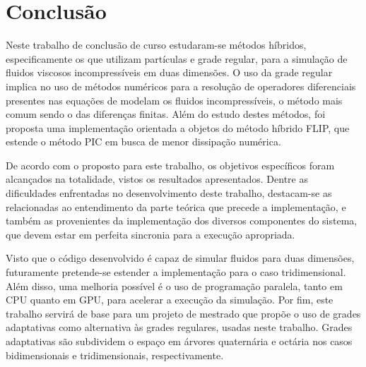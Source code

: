 \documentclass[12pt,a4paper,dvipsnames]{article}
\begin{document}
\clearpage


\section{Conclusão}
\label{sec:conclusion}

Neste trabalho de conclusão de curso estudaram-se métodos híbridos, especificamente os que utilizam partículas e grade regular, para a simulação de fluidos viscosos incompressíveis em duas dimensões. O uso da grade regular implica no uso de métodos numéricos para a resolução de operadores diferenciais presentes nas equações de modelam os fluidos incompressíveis, o método mais comum sendo o das diferenças finitas. Além do estudo destes métodos, foi proposta uma implementação orientada a objetos do método híbrido FLIP, que estende o método PIC em busca de menor dissipação numérica.

De acordo com o proposto para este trabalho, os objetivos específicos foram alcançados na totalidade, vistos os resultados apresentados. Dentre as dificuldades enfrentadas no desenvolvimento deste trabalho, destacam-se as relacionadas ao entendimento da parte teórica que precede a implementação, e também as provenientes da implementação dos diversos componentes do sistema, que devem estar em perfeita sincronia para a execução apropriada.

Visto que o código desenvolvido é capaz de simular fluidos para duas dimensões, futuramente pretende-se estender a implementação para o caso tridimensional. Além disso, uma melhoria possível é o uso de programação paralela, tanto em CPU quanto em GPU, para acelerar a execução da simulação. Por fim, este trabalho servirá de base para um projeto de mestrado que propõe o uso de grades adaptativas como alternativa às grades regulares, usadas neste trabalho. Grades adaptativas são subdividem o espaço em árvores quaternária e octária nos casos bidimensionais e tridimensionais, respectivamente. 

\footnotesize


\end{document}
